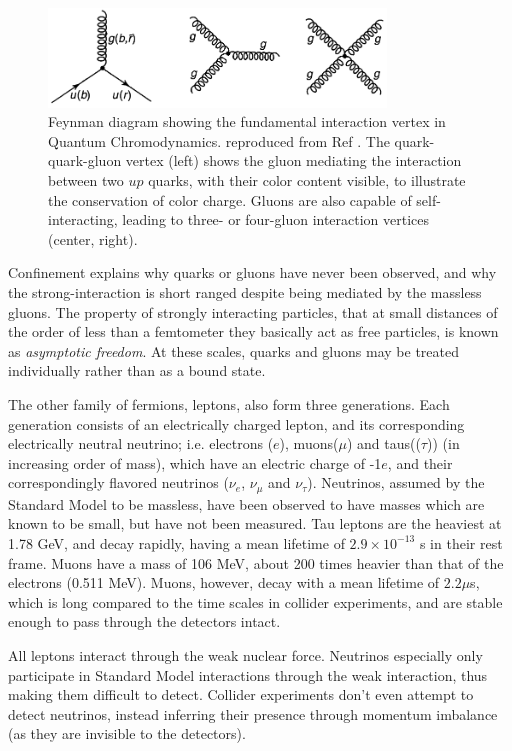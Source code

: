 \documentclass[12pt,a4paper,openright,twoside]{report}
\begin{document}
\begin{figure}[h]
\centering
\includegraphics[width = 0.8\textwidth]{fundamental_vertex_qcd.png}
\caption{Feynman diagram showing the fundamental interaction vertex in Quantum Chromodynamics. reproduced from Ref \cite{griff}. The quark-quark-gluon vertex (left) shows the gluon mediating the interaction between two $up$ quarks, with their color content visible, to illustrate the conservation of color charge. Gluons are also capable of self-interacting, leading to three- or four-gluon interaction vertices (center, right).}
\label{fig:qcd_fund_vertex}
\end{figure}

Confinement explains why quarks or gluons have never been observed, and why the strong-interaction is short ranged despite being mediated by the massless gluons. The property of strongly interacting particles, that at small distances of the order of less than a femtometer they basically act as free particles, is known as \textit{asymptotic freedom}. At these scales, quarks and gluons may be treated individually rather than as a bound state. 

The other family of fermions, leptons, also form three generations. Each generation consists of an electrically charged lepton, and its corresponding electrically neutral neutrino; i.e. electrons ($e$), muons($\mu$) and taus(($\tau$)) (in increasing order of mass), which have an electric charge of -1$e$, and their correspondingly flavored neutrinos ($\nu_e$, $\nu_{\mu}$ and $\nu_{\tau}$). Neutrinos, assumed by the Standard Model to be massless, have been observed to have masses \cite{nu1,nu2,nu3} which are known to be small, but have not been measured. Tau leptons are the heaviest at 1.78 GeV, and decay rapidly, having a mean lifetime of $2.9\times 10^{-13}$ s in their rest frame. Muons have a mass of 106 MeV, about 200 times heavier than that of the electrons (0.511 MeV). Muons, however, decay with a mean lifetime of $2.2 \mu$s, which is long compared to the time scales in collider experiments, and are stable enough to pass through the detectors intact.

All leptons interact through the weak nuclear force. Neutrinos especially only participate in Standard Model interactions through the weak interaction, thus making them difficult to detect. Collider experiments don't even attempt to detect neutrinos, instead inferring their presence through momentum imbalance (as they are invisible to the detectors). 
\end{document}
